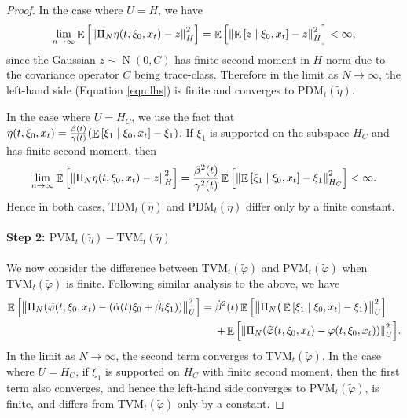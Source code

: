 \begin{proof}
  In the case where \(U = H\), we have
  \[
    \lim\limits_{n \to \infty} \mathop{\mathbb{E}}\qty[\norm{\Pi_{N} \eta(t, \xi_{0}, x_{t}) - z}^{2}_{H}] = \mathop{\mathbb{E}}\qty[\norm{\mathop{\mathbb{E}}\qty[z \mid \xi_{0}, x_{t}] - z}_{H}^{2}] < \infty,
  \]
  since the Gaussian \(z \sim \operatorname{N}(0, C)\) has finite second moment in \(H\)-norm due to the covariance operator \(C\) being trace-class. Therefore in the limit as \(N \to \infty\), the left-hand side (Equation \ref{eqn:lhs}) is finite and converges to \(\mathrm{PDM}_{t}(\widetilde{\eta})\).

  In the case where \(U = H_{C}\), we use the fact that \(\eta(t,\xi_{0}, x_{t}) = \frac{\beta(t)}{\gamma(t)}\qty(\mathop{\mathbb{E}}\qty[\xi_{1} \mid \xi_{0}, x_{t}] - \xi_{1})\). If \(\xi_{1}\) is supported on the subspace \(H_{C}\) and has finite second moment, then
  \[
    \lim\limits_{n \to \infty} \mathop{\mathbb{E}}\qty[\norm{\Pi_{N} \eta(t, \xi_{0}, x_{t}) - z}^{2}_{H}]  = \frac{\beta^{2}(t)}{\gamma^{2}(t)} \mathop{\mathbb{E}}\qty[\norm{\mathop{\mathbb{E}}\qty[\xi_{1} \mid \xi_{0}, x_{t}] - \xi_{1}}_{H_{C}}^{2}] < \infty.
  \]
  Hence in both cases,  \(\mathrm{TDM}_{t}(\widetilde{\eta})\) and \(\mathrm{PDM}_{t}(\widetilde{\eta})\) differ only by a finite constant.

  \paragraph{Step 2: \(\mathrm{PVM}_{t}(\widetilde{\eta}) - \mathrm{TVM}_{t}(\widetilde{\eta})\)}

  We now consider the difference between \(\mathrm{TVM}_{t}(\widetilde{\varphi})\) and \(\mathrm{PVM}_{t}(\widetilde{\varphi})\) when \(\mathrm{TVM}_{t}(\widetilde{\varphi})\) is finite. Following similar analysis to the above, we have
  \begin{align*}
    \mathop{\mathbb{E}}\qty[\norm{\Pi_{N}( \widetilde{\varphi}(t, \xi_{0}, x_{t}) - (\dot{\alpha}(t) \xi_{0} + \dot{\beta}_{t} \xi_{1}) )}^{2}_{U}] &= \dot{\beta}^{2}(t)\mathop{\mathbb{E}}\qty[\norm{\Pi_{N} \big(\mathop{\mathbb{E}}\qty[\xi_{1} \mid \xi_{0}, x_{t}] - \xi_{1}\big)}_{U}^{2}] \\
    &\mathrel{\phantom{=}}\, + \mathop{\mathbb{E}}\qty[\norm{\Pi_{N}(\widetilde{\varphi}(t, \xi_{0}, x_{t}) - \varphi(t, \xi_{0}, x_{t}))}^{2}_{U}].
  \end{align*}
  In the limit as \(N \to \infty\), the second term converges to \(\mathrm{TVM}_{t}(\widetilde{\varphi})\). In the case where \(U = H_{C}\), if \(\xi_{1}\) is supported on \(H_{C}\) with finite second moment, then the first term also converges, and hence the left-hand side converges to \(\mathrm{PVM}_{t}(\widetilde{\varphi})\), is finite, and differs from \(\mathrm{TVM}_{t}(\widetilde{\varphi})\) only by a constant.


\end{proof}
